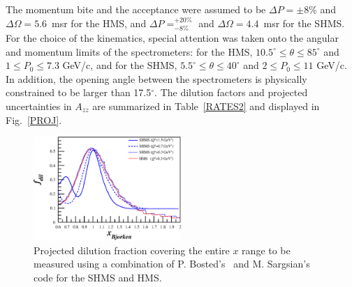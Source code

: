 The momentum bite and the acceptance were assumed to be $\Delta P = \pm 8\%$ and $\Delta\Omega = 5.6$~msr for the HMS, and $\Delta P= ^{+20\%}_{-8\%}$ 
and $\Delta\Omega =4.4$~msr for the SHMS. 
%
For the choice of the kinematics,
special attention was taken onto the angular and momentum limits of the spectrometers: for the
HMS, $10.5^{\circ} \le \theta \le 85^{\circ}$ and $1 \le P_0 \le 7.3$ GeV/c, and for the SHMS,
$5.5^{\circ} \le \theta \le 40^{\circ}$ and $2 \le P_0 \le 11$ GeV/c. In addition, the
opening angle between the spectrometers is physically constrained to be larger than 17.5$^{\circ}$.
The dilution factors and projected uncertainties in $A_{zz}$ are summarized in Table~\ref{RATES2} and displayed in Fig.~\ref{PROJ}.  

\begin{figure}
\begin{center}
\includegraphics[width=0.5\textwidth]{figs/Pzz_30_fdil_all.eps} 
\caption{\label{fdil_plot}Projected dilution fraction covering the entire $x$ range to be measured using a combination of P. Bosted's~\cite{Bosted:2012qc} and M. Sargsian's~\cite{misak-convo} code for the SHMS and HMS.}
\end{center}
\end{figure}

